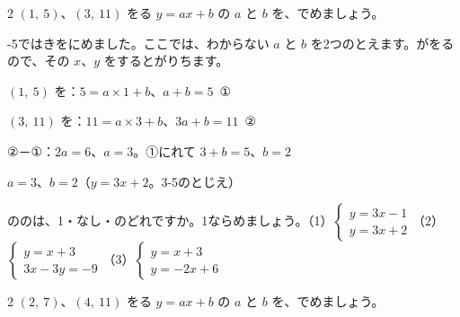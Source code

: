 \begin{reidai}
2 $(1,\ 5)$、$(3,\ 11)$ をる $y=ax+b$ の $a$ と $b$ を、でめましょう。\par
{}-5ではきをにめました。ここでは、わからない $a$ と $b$ を2つのとえます。がをるので、その $x$、$y$ をするとがりちます。\par
\shiki $(1,\ 5)$ を：$5=a\times1+b$、$a+b=5$\ ①\par
\hspace*{2.6\zw}$(3,\ 11)$ を：$11=a\times3+b$、$3a+b=11$\ ②\par
\hspace*{2.6\zw}②－①：$2a=6$、$a=3$。①にれて $3+b=5$、$b=2$\par
\kotae $a=3$、$b=2$（$y=3x+2$。3-5のとじえ）
\end{reidai}

\begingroup{}%
\noindent\begin{minipage}[t]{0.49\linewidth}
\begin{jibun}\raggedright
{}ののは、1・なし・のどれですか。1ならめましょう。（1）\nobreak $\begin{cases} y=3x-1\\ y=3x+2 \end{cases}$\quad（2）\nobreak $\begin{cases} y=x+3\\ 3x-3y=-9 \end{cases}$\quad（3）\nobreak $\begin{cases} y=x+3\\ y=-2x+6 \end{cases}$
\end{jibun}
\end{minipage}\hfill
\begin{minipage}[t]{0.49\linewidth}
\begin{jibun}\raggedright
2 $(2,\ 7)$、$(4,\ 11)$ をる $y=ax+b$ の $a$ と $b$ を、でめましょう。
\end{jibun}
\end{minipage}\par
\endgroup

